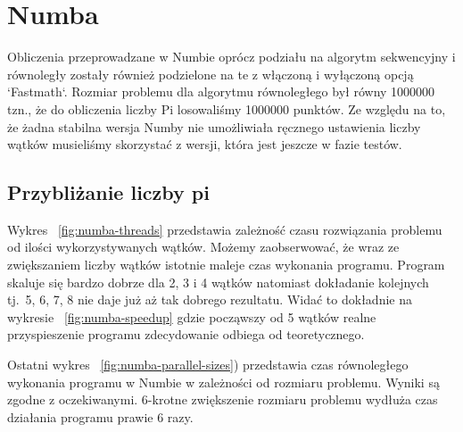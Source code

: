 \section{Numba}
Obliczenia przeprowadzane w Numbie oprócz podziału na algorytm sekwencyjny i równoległy
zostały również podzielone na te z włączoną i wyłączoną  opcją `Fastmath`.
Rozmiar problemu dla algorytmu równoległego był równy 1000000 tzn., że do obliczenia
liczby Pi losowaliśmy 1000000 punktów.
Ze względu na to, że żadna stabilna wersja Numby nie umożliwiała ręcznego ustawienia
liczby wątków musieliśmy skorzystać z wersji, która jest jeszcze w fazie testów.


\subsection{Przybliżanie liczby pi}

\begin{figure*}
    \centering
    \begin{minipage}[b]{.45\textwidth}
        \centering
        
        \caption{Przyspieszenie liczenia liczby $\pi$ w Numbie}
        \label{fig:numba-speedup}
    \end{minipage}
    \hfill
    \begin{minipage}[b]{.45\textwidth}
        \centering
        
        \caption{Czas wykonania algorytmu w Numbie w zależności od liczby wątków}
        \label{fig:numba-threads}
    \end{minipage}
\end{figure*}

\begin{figure*}
    \centering
    
    \caption{Czas równoległego wykonania algorytmu w Numbie w zależności od rozmiaru problemu}
    \label{fig:numba-parallel-sizes}
\end{figure*}

Wykres ~\ref{fig:numba-threads} przedstawia zależność czasu rozwiązania problemu
od ilości wykorzystywanych
wątków.
Możemy zaobserwować, że wraz ze zwiększaniem liczby wątków istotnie maleje czas
wykonania programu.
Program skaluje się bardzo dobrze dla 2, 3 i 4 wątków natomiast
dokładanie kolejnych tj.\ 5, 6, 7, 8 nie daje już aż tak dobrego rezultatu.
Widać to dokładnie
na wykresie ~\ref{fig:numba-speedup} gdzie począwszy od 5 wątków realne przyspieszenie
programu zdecydowanie odbiega od teoretycznego.

Ostatni wykres ~\ref{fig:numba-parallel-sizes}) przedstawia czas równoległego wykonania
programu w Numbie w zależności od rozmiaru problemu.
Wyniki są zgodne z oczekiwanymi.
6-krotne zwiększenie rozmiaru problemu wydłuża czas działania programu prawie 6 razy.

